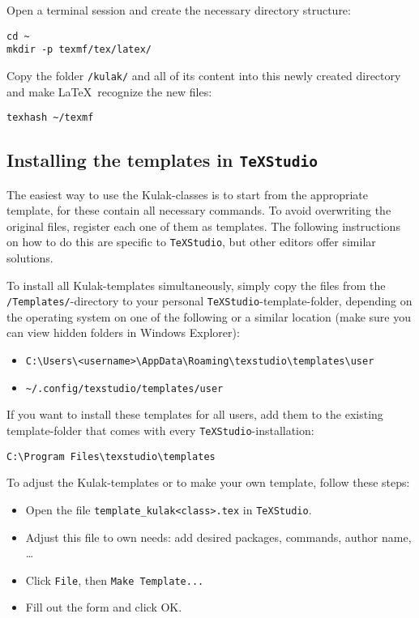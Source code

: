 \documentclass[kulak]{kulakarticle} %
\begin{document}
Open a terminal session and create the necessary directory structure:
\begin{verbatim}
cd ~
mkdir -p texmf/tex/latex/
\end{verbatim}
Copy the folder \texttt{/kulak/} and all of its content into this newly created directory and make \LaTeX\ recognize the new files:
\begin{verbatim}
texhash ~/texmf
\end{verbatim}

\subsection{Installing the templates in \texttt{TeXStudio}}
\label{ssec:templates}

The easiest way to use the Kulak-classes is to start from the appropriate template, for these contain all necessary commands. To avoid overwriting the original files, register each one of them as templates. The following instructions on how to do this are specific to \texttt{TeXStudio}, but other editors offer similar solutions. 

To install all Kulak-templates simultaneously, simply copy the files from the \verb|/Templates/|-directory to your personal \texttt{TeXStudio}-template-folder, depending on the operating system on one of the following or a similar location (make sure you can view hidden folders in Windows Explorer):
\begin{itemize}
\item \verb=C:\Users\<username>\AppData\Roaming\texstudio\templates\user=
\item \verb=~/.config/texstudio/templates/user=
\end{itemize}

If you want to install these templates for all users, add them to the existing template-folder that comes with every \texttt{TeXStudio}-installation:

\begin{verbatim}
C:\Program Files\texstudio\templates
\end{verbatim}

To adjust the Kulak-templates or to make your own template, follow these steps:
\begin{itemize}
\item Open the file \verb+template_kulak<class>.tex+ in \texttt{TeXStudio}.
\item Adjust this file to own needs: add desired packages, commands, author name, \ldots
\item Click \texttt{File}, then \texttt{Make Template...}
\item Fill out the form and click OK.
\end{itemize}
\end{document}
